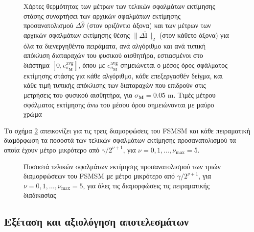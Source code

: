\begin{figure}\vspace{2cm}\hspace{0.5cm}
  
  \vspace{1cm}
  \caption{\small Χάρτες θερμότητας των μέτρων των τελικών σφαλμάτων εκτίμησης
           στάσης συναρτήσει των αρχικών σφαλμάτων εκτίμησης προσανατολισμού
           $\Delta\hat{\theta}$ (στον οριζόντιο άξονα) και των μέτρων των
           αρχικών σφαλμάτων εκτίμησης θέσης $\|\Delta \hat{\bm{l}}\|_2$ (στον
           κάθετο άξονα) για όλα τα διενεργηθέντα πειράματα, ανά αλγόριθμο και
           ανά τυπική απόκλιση διαταραχών του φυσικού αισθητήρα, εστιασμένοι
           στο διάστημα $[0, e_{\sigma_{\bm{M}}}^{\text{avg}}]$, όπου με
           $e_{\sigma_{\bm{M}}}^{\text{avg}}$ σημειώνεται ο μέσος όρος
           σφάλματος εκτίμησης στάσης για κάθε αλγόριθμο, κάθε επεξεργασθέν
           δείγμα, και κάθε τιμή τυπικής απόκλισης των διαταραχών που επιδρούν
           στις μετρήσεις του φυσικού αισθητήρα, για $\sigma_{\bm{M}} = 0.05$
           m.  Τιμές μέτρου σφάλματος εκτίμησης άνω του μέσου όρου σημειώνονται
           με μαύρο χρώμα}
  \label{fig:02_04_05:09}
\end{figure}

Το σχήμα \ref{fig:02_04_05:13} απεικονίζει για τις τρεις διαμορφώσεις του FSMSM
και κάθε πειραματική διαμόρφωση τα ποσοστά των τελικών σφαλμάτων εκτίμησης
προσανατολισμού τα οποία έχουν μέτρο μικρότερο από $\gamma / 2^{\nu+1}$, για
$\nu = 0,1,\dots,\nu_{\max} = 5$.

\begin{figure}\centering
  
  \vspace{-0.5cm}
  \caption{\small Ποσοστά τελικών σφαλμάτων εκτίμησης προσανατολισμού των
           τριών διαμορφώσεων του FSMSM με μέτρο μικρότερο από $\gamma /
           2^{\nu+1}$, για $\nu = 0,1,\dots,\nu_{\max} = 5$, για όλες τις
           διαμορφώσεις τις πειραματικής διαδικασίας}
  \label{fig:02_04_05:13}
\end{figure}




\subsection{Εξέταση και αξιολόγηση αποτελεσμάτων}
\label{subsection:02_04_05:03}

